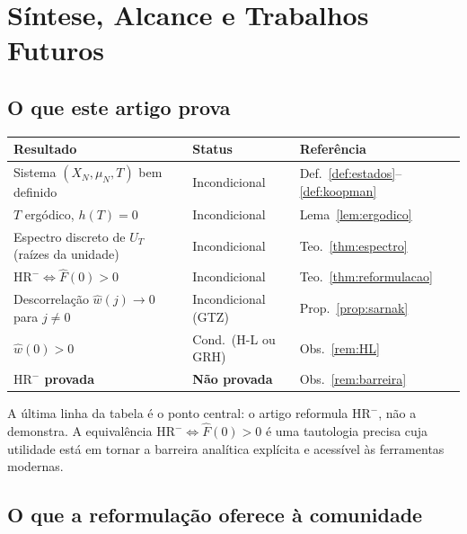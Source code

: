 \documentclass[12pt,a4paper]{article}
\theoremstyle{definition}
\newcommand{\HRm}{\mathrm{HR}^{-}}
\begin{document}
	\section{Síntese, Alcance e Trabalhos Futuros}
	\label{sec:conclusao}
	
	\subsection{O que este artigo prova}
	
	\begin{center}
		\renewcommand{\arraystretch}{1.4}
		\begin{tabular}{lll}
			\toprule
			\textbf{Resultado} & \textbf{Status} & \textbf{Referência} \\
			\midrule
			Sistema $(X_N,\mu_N,T)$ bem definido & Incondicional & Def.~\ref{def:estados}--\ref{def:koopman} \\
			$T$ ergódico, $h(T) = 0$ & Incondicional & Lema~\ref{lem:ergodico} \\
			Espectro discreto de $U_T$ (raízes da unidade) & Incondicional & Teo.~\ref{thm:espectro} \\
			$\HRm \Leftrightarrow \widehat{F}(0) > 0$ & Incondicional & Teo.~\ref{thm:reformulacao} \\
			Descorrelação $\widehat{w}(j) \to 0$ para $j \neq 0$ & Incondicional (GTZ) & Prop.~\ref{prop:sarnak} \\
			$\widehat{w}(0) > 0$ & Cond.\ (H-L ou GRH) & Obs.~\ref{rem:HL} \\
			\midrule
			\textbf{$\HRm$ provada} & \textbf{Não provada} & Obs.~\ref{rem:barreira} \\
			\bottomrule
		\end{tabular}
	\end{center}
	
	A última linha da tabela é o ponto central: o artigo reformula $\HRm$,
	não a demonstra. A equivalência $\HRm \Leftrightarrow \widehat{F}(0) > 0$
	é uma tautologia precisa cuja utilidade está em tornar a barreira analítica
	explícita e acessível às ferramentas modernas.
	
	\subsection{O que a reformulação oferece à comunidade}
	
\end{document}
